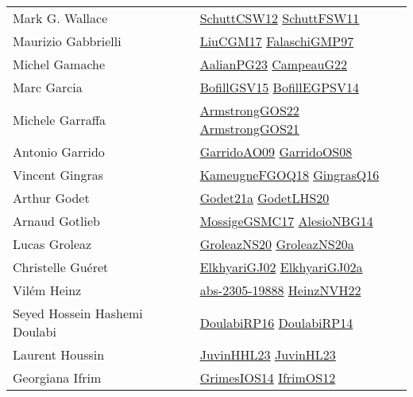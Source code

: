 {\begin{longtable}{p{4cm}p{20cm}}
Mark G. Wallace & \href{papers/SchuttCSW12.pdf}{SchuttCSW12}\cite{SchuttCSW12} \href{articles/SchuttFSW11.pdf}{SchuttFSW11}\cite{SchuttFSW11} \\
Maurizio Gabbrielli & \href{papers/LiuCGM17.pdf}{LiuCGM17}\cite{LiuCGM17} \href{articles/FalaschiGMP97.pdf}{FalaschiGMP97}\cite{FalaschiGMP97} \\
Michel Gamache & \href{papers/AalianPG23.pdf}{AalianPG23}\cite{AalianPG23} \href{articles/CampeauG22.pdf}{CampeauG22}\cite{CampeauG22} \\
Marc Garcia & \href{papers/BofillGSV15.pdf}{BofillGSV15}\cite{BofillGSV15} \href{papers/BofillEGPSV14.pdf}{BofillEGPSV14}\cite{BofillEGPSV14} \\
Michele Garraffa & \href{papers/ArmstrongGOS22.pdf}{ArmstrongGOS22}\cite{ArmstrongGOS22} \href{papers/ArmstrongGOS21.pdf}{ArmstrongGOS21}\cite{ArmstrongGOS21} \\
Antonio Garrido & \href{articles/GarridoAO09.pdf}{GarridoAO09}\cite{GarridoAO09} \href{articles/GarridoOS08.pdf}{GarridoOS08}\cite{GarridoOS08} \\
Vincent Gingras & \href{papers/KameugneFGOQ18.pdf}{KameugneFGOQ18}\cite{KameugneFGOQ18} \href{papers/GingrasQ16.pdf}{GingrasQ16}\cite{GingrasQ16} \\
Arthur Godet & \href{}{Godet21a}\cite{Godet21a} \href{papers/GodetLHS20.pdf}{GodetLHS20}\cite{GodetLHS20} \\
Arnaud Gotlieb & \href{papers/MossigeGSMC17.pdf}{MossigeGSMC17}\cite{MossigeGSMC17} \href{papers/AlesioNBG14.pdf}{AlesioNBG14}\cite{AlesioNBG14} \\
Lucas Groleaz & \href{papers/GroleazNS20.pdf}{GroleazNS20}\cite{GroleazNS20} \href{papers/GroleazNS20a.pdf}{GroleazNS20a}\cite{GroleazNS20a} \\
Christelle Gu{\'{e}}ret & \href{papers/ElkhyariGJ02.pdf}{ElkhyariGJ02}\cite{ElkhyariGJ02} \href{papers/ElkhyariGJ02a.pdf}{ElkhyariGJ02a}\cite{ElkhyariGJ02a} \\
Vil{\'{e}}m Heinz & \href{articles/abs-2305-19888.pdf}{abs-2305-19888}\cite{abs-2305-19888} \href{articles/HeinzNVH22.pdf}{HeinzNVH22}\cite{HeinzNVH22} \\
Seyed Hossein Hashemi Doulabi & \href{}{DoulabiRP16}\cite{DoulabiRP16} \href{papers/DoulabiRP14.pdf}{DoulabiRP14}\cite{DoulabiRP14} \\
Laurent Houssin & \href{papers/JuvinHHL23.pdf}{JuvinHHL23}\cite{JuvinHHL23} \href{papers/JuvinHL23.pdf}{JuvinHL23}\cite{JuvinHL23} \\
Georgiana Ifrim & \href{articles/GrimesIOS14.pdf}{GrimesIOS14}\cite{GrimesIOS14} \href{papers/IfrimOS12.pdf}{IfrimOS12}\cite{IfrimOS12} \\

\end{longtable}}
